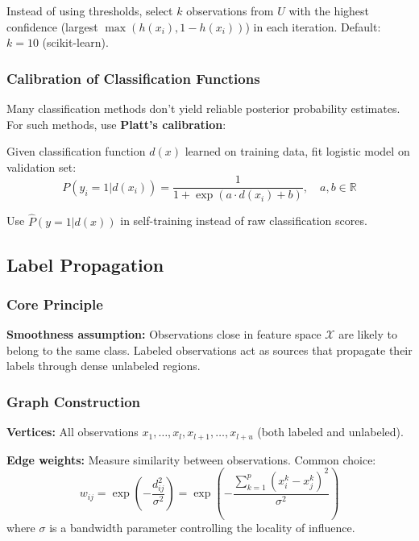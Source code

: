 \documentclass[12pt,a4paper]{article}
\begin{document}
Instead of using thresholds, select $k$ observations from $U$ with the highest confidence (largest $\max(h(x_i), 1-h(x_i))$) in each iteration. Default: $k = 10$ (scikit-learn).

\subsubsection{Calibration of Classification Functions}

Many classification methods don't yield reliable posterior probability estimates. For such methods, use \textbf{Platt's calibration}:

Given classification function $d(x)$ learned on training data, fit logistic model on validation set:
\begin{equation}
P(y_i = 1|d(x_i)) = \frac{1}{1 + \exp(a \cdot d(x_i) + b)}, \quad a, b \in \mathbb{R}
\end{equation}

Use $\hat{P}(y = 1|d(x))$ in self-training instead of raw classification scores.

\subsection{Label Propagation}

\subsubsection{Core Principle}

\textbf{Smoothness assumption:} Observations close in feature space $\mathcal{X}$ are likely to belong to the same class. Labeled observations act as sources that propagate their labels through dense unlabeled regions.

\subsubsection{Graph Construction}

\textbf{Vertices:} All observations $x_1, \ldots, x_l, x_{l+1}, \ldots, x_{l+u}$ (both labeled and unlabeled).

\textbf{Edge weights:} Measure similarity between observations. Common choice:
\begin{equation}
w_{ij} = \exp\left(-\frac{d_{ij}^2}{\sigma^2}\right) = \exp\left(-\frac{\sum_{k=1}^p (x_i^k - x_j^k)^2}{\sigma^2}\right)
\end{equation}
where $\sigma$ is a bandwidth parameter controlling the locality of influence.
\end{document}

